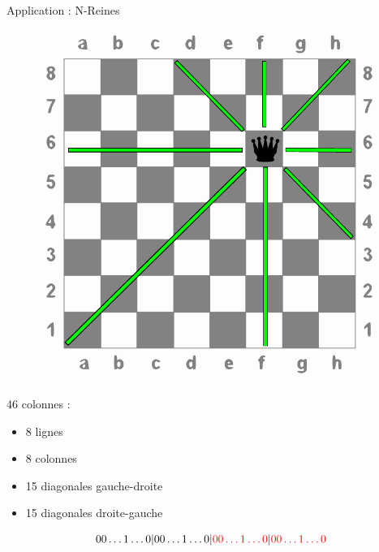 \documentclass{beamer}
\begin{document}
\begin{frame}{Application : N-Reines}
\begin{figure}[h]
\begin{center}
\includegraphics[height=0.4\textheight]{../imports/8queens.pdf}
\end{center}
\end{figure}

46 colonnes : 
\begin{itemize}
\item 8 lignes
\item 8 colonnes
\item 15 diagonales gauche-droite
\item 15 diagonales droite-gauche
\end{itemize}
\[
	0 0 \dots 1 \dots 0 | 0 0 \dots 1 \dots 0 |
	\textcolor{red}{0 0 \dots 1 \dots 0} | \textcolor{red}{0 0 \dots 1 \dots 0} 
\]

\end{frame}
\end{document}
